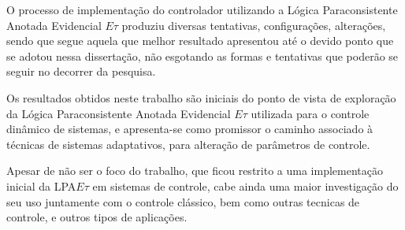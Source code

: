O processo de implementação do controlador utilizando a 
Lógica Paraconsistente Anotada Evidencial $E\tau$
produziu diversas tentativas, configurações, alterações, 
sendo que segue aquela que melhor resultado apresentou até
o devido ponto que se adotou nessa dissertação, 
não esgotando as formas e tentativas que poderão se seguir 
no decorrer da pesquisa.


Os resultados obtidos neste trabalho são iniciais 
do ponto de vista de exploração da 
Lógica Paraconsistente Anotada Evidencial $E\tau$ 
utilizada para o controle dinâmico de sistemas, 
e apresenta-se como promissor o caminho 
associado à técnicas de sistemas adaptativos,
para alteração de parâmetros de controle.

Apesar de não ser o foco do trabalho, 
que ficou restrito a uma implementação inicial 
da LPA$E\tau$ em sistemas de controle,
cabe ainda uma maior investigação do seu uso
juntamente com o controle clássico,
bem como outras tecnicas de controle,
e outros tipos de aplicações.

